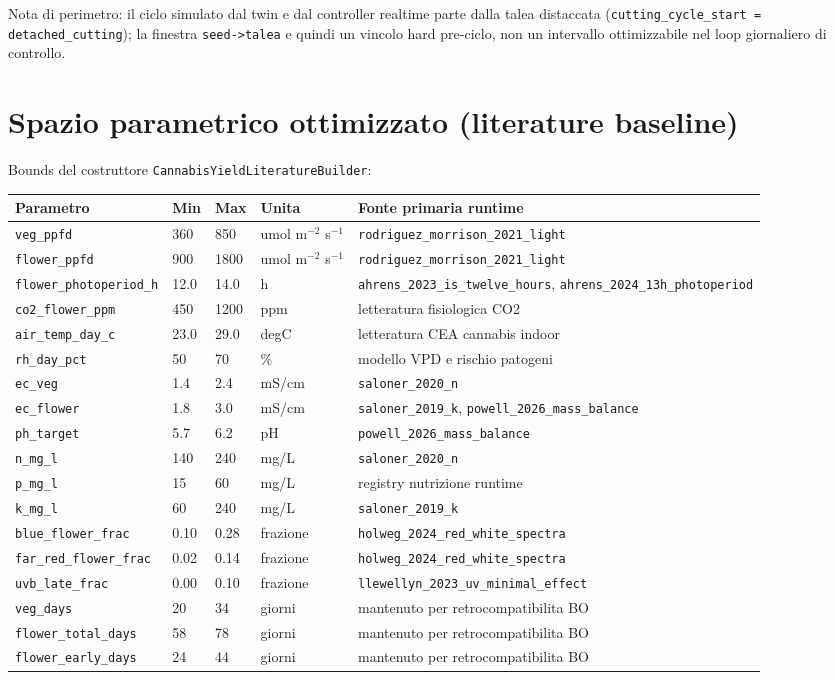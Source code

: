 ﻿\documentclass[11pt,a4paper]{report}
\begin{document}
Nota di perimetro: il ciclo simulato dal twin e dal controller realtime parte dalla talea distaccata
(\texttt{cutting\_cycle\_start = detached\_cutting}); la finestra \texttt{seed->talea} e quindi un vincolo hard pre-ciclo,
non un intervallo ottimizzabile nel loop giornaliero di controllo.

\section{Spazio parametrico ottimizzato (literature baseline)}
Bounds del costruttore \texttt{CannabisYieldLiteratureBuilder}:
\begin{longtable}{@{}p{3.4cm}p{1.2cm}p{1.2cm}p{2.0cm}p{5.0cm}@{}}
\toprule
Parametro & Min & Max & Unita & Fonte primaria runtime \\ \midrule
\texttt{veg\_ppfd} & 360 & 850 & umol m$^{-2}$ s$^{-1}$ & \texttt{rodriguez\_morrison\_2021\_light} \\
\texttt{flower\_ppfd} & 900 & 1800 & umol m$^{-2}$ s$^{-1}$ & \texttt{rodriguez\_morrison\_2021\_light} \\
\texttt{flower\_photoperiod\_h} & 12.0 & 14.0 & h & \texttt{ahrens\_2023\_is\_twelve\_hours}, \texttt{ahrens\_2024\_13h\_photoperiod} \\
\texttt{co2\_flower\_ppm} & 450 & 1200 & ppm & letteratura fisiologica CO2 \\
\texttt{air\_temp\_day\_c} & 23.0 & 29.0 & degC & letteratura CEA cannabis indoor \\
\texttt{rh\_day\_pct} & 50 & 70 & \% & modello VPD e rischio patogeni \\
\texttt{ec\_veg} & 1.4 & 2.4 & mS/cm & \texttt{saloner\_2020\_n} \\
\texttt{ec\_flower} & 1.8 & 3.0 & mS/cm & \texttt{saloner\_2019\_k}, \texttt{powell\_2026\_mass\_balance} \\
\texttt{ph\_target} & 5.7 & 6.2 & pH & \texttt{powell\_2026\_mass\_balance} \\
\texttt{n\_mg\_l} & 140 & 240 & mg/L & \texttt{saloner\_2020\_n} \\
\texttt{p\_mg\_l} & 15 & 60 & mg/L & registry nutrizione runtime \\
\texttt{k\_mg\_l} & 60 & 240 & mg/L & \texttt{saloner\_2019\_k} \\
\texttt{blue\_flower\_frac} & 0.10 & 0.28 & frazione & \texttt{holweg\_2024\_red\_white\_spectra} \\
\texttt{far\_red\_flower\_frac} & 0.02 & 0.14 & frazione & \texttt{holweg\_2024\_red\_white\_spectra} \\
\texttt{uvb\_late\_frac} & 0.00 & 0.10 & frazione & \texttt{llewellyn\_2023\_uv\_minimal\_effect} \\
\texttt{veg\_days} & 20 & 34 & giorni & mantenuto per retrocompatibilita BO \\
\texttt{flower\_total\_days} & 58 & 78 & giorni & mantenuto per retrocompatibilita BO \\
\texttt{flower\_early\_days} & 24 & 44 & giorni & mantenuto per retrocompatibilita BO \\
\bottomrule
\end{longtable}
\end{document}
